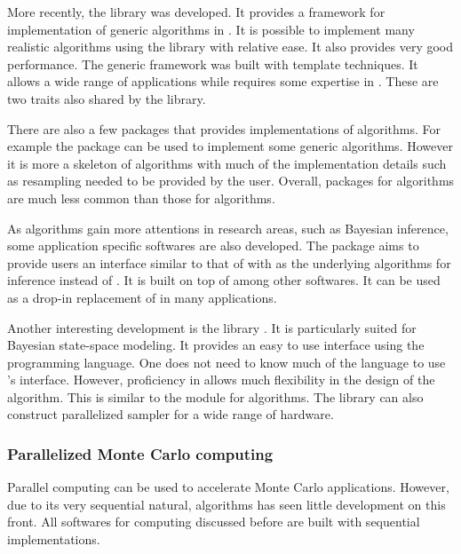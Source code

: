 More recently, the \smctc library \cite{smctc} was developed. It provides a
framework for implementation of generic \smc algorithms in \cpp. It is
possible to implement many realistic algorithms using the library with
relative ease. It also provides very good performance. The generic framework
was built with \cpp template techniques. It allows a wide range of
applications while requires some expertise in \cpp. These are two traits also
shared by the \vsmc library.

There are also a few \rlang packages that provides implementations of \smc
algorithms. For example the \rsmc \cite{rsmc} package can be used to implement
some generic \smc algorithms. However it is more a skeleton of \smc algorithms
with much of the implementation details such as resampling needed to be
provided by the user. Overall, \rlang packages for \smc algorithms are much
less common than those for \mcmc algorithms.

As \smc algorithms gain more attentions in research areas, such as Bayesian
inference, some application specific softwares are also developed. The \biips
\cite{biips} package aims to provide users an interface similar to that of
\bugs with \smc as the underlying algorithms for inference instead of \mcmc.
It is built on top of \smctc among other softwares. It can be used as a
drop-in replacement of \bugs in many applications.

Another interesting development is the \libbi library \cite{libbi}. It is
particularly suited for Bayesian state-space modeling. It provides an easy to
use interface using the \perl programming language. One does not need to know
much of the language to use \libbi's interface. However, proficiency in \perl
allows much flexibility in the design of the algorithm. This is similar to the
\pymc module for \mcmc algorithms. The library can also construct parallelized
sampler for a wide range of hardware.

\subsubsection{Parallelized Monte Carlo computing}
\label{ssub:Parallelized Monte Carlo computing}

Parallel computing can be used to accelerate Monte Carlo applications.
However, due to its very sequential natural, \mcmc algorithms has seen little
development on this front. All softwares for \mcmc computing discussed before
are built with sequential implementations.

